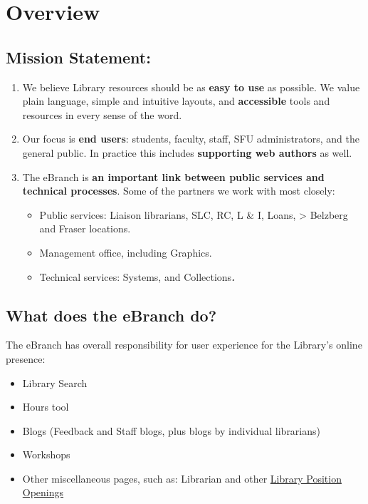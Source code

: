 \documentclass[
  openany]{book}
\providecommand{\tightlist}{%
  \setlength{\itemsep}{0pt}\setlength{\parskip}{0pt}}
\begin{document}
\hypertarget{overview}{%
\chapter{Overview}\label{overview}}

\hypertarget{mission-statement}{%
\section{Mission Statement:}\label{mission-statement}}

\begin{enumerate}
\def\labelenumi{\Alph{enumi}.}
\item
  We believe Library resources should be as \textbf{easy to use} as possible. We value plain language, simple and intuitive layouts, and \textbf{accessible} tools and resources in every sense of the word.
\item
  Our focus is \textbf{end users}: students, faculty, staff, SFU administrators, and the general public. In practice this includes \textbf{supporting web authors} as well.
\item
  The eBranch is \textbf{an important link between public services and technical processes}. Some of the partners we work with most closely:

  \begin{itemize}
  \item
    Public services: Liaison librarians, SLC, RC, L \& I, Loans,
    \textgreater{} Belzberg and Fraser locations.
  \item
    Management office, including Graphics.
  \item
    Technical services: Systems, and Collections\textbf{\emph{.}}
  \end{itemize}
\end{enumerate}

\hypertarget{what-does-the-ebranch-do}{%
\section{What does the eBranch do?}\label{what-does-the-ebranch-do}}

The eBranch has overall responsibility for user experience for the
Library's online presence:

\begin{itemize}
\tightlist
\item
  Library Search
\item
  Hours tool
\item
  Blogs (Feedback and Staff blogs, plus blogs by individual librarians)
\item
  Workshops
\item
  Other miscellaneous pages, such as: Librarian and other \href{https://www.lib.sfu.ca/about/overview/employment/librarian-jobs}{Library Position Openings}
\end{itemize}
\end{document}
